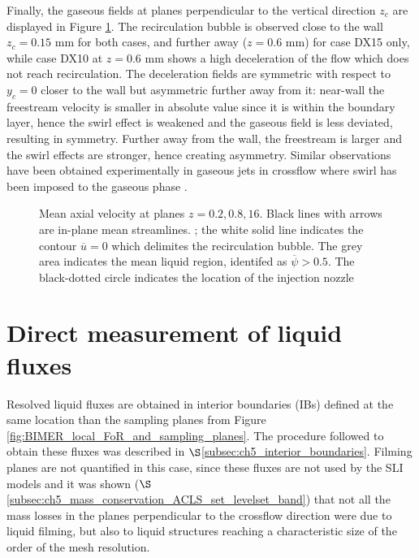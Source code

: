 Finally, the gaseous fields at planes perpendicular to the vertical direction $z_c$ are displayed in Figure \ref{fig:BIMER_turbulent_structures_planes_z}. The recirculation bubble is observed close to the wall $z_c = 0.15$ mm for both cases, and further away ($z = 0.6$ mm) for case DX15 only, while case DX10 at $z = 0.6$ mm shows a high deceleration of the flow which does not reach recirculation. The deceleration fields are symmetric with respect to $y_c = 0$ closer to the wall but asymmetric further away from it: near-wall the freestream velocity is smaller in absolute value since it is within the boundary layer, hence the swirl effect is weakened and the gaseous field is less deviated, resulting in symmetry. Further away from the wall, the freestream is larger and the swirl effects are stronger, hence creating asymmetry. Similar observations have been obtained experimentally in gaseous jets in crossflow where swirl has been imposed to the gaseous phase .



\begin{figure}[ht]
\centering
\caption[Mean axial velocity at planes $z = 0.2, 0.8, 16$ mm]{Mean axial velocity at planes $z = 0.2, 0.8, 16$. Black lines with arrows are in-plane mean streamlines. ; the white solid line indicates the contour $\overline{u} = 0$ which delimites the recirculation bubble. The grey area  indicates the mean liquid region, identifed as $\overline{\psi} > 0.5$. The black-dotted circle indicates the location of the injection nozzle}
\label{fig:BIMER_turbulent_structures_planes_z}
\end{figure}



\section{Direct measurement of liquid fluxes}
\label{sec:ch8_BIMER_IBs}

Resolved liquid fluxes are obtained in  interior boundaries (IBs) defined at the same location than the sampling planes from Figure \ref{fig:BIMER_local_FoR_and_sampling_planes}. The procedure followed to obtain these fluxes was described in $\S$\ref{subsec:ch5_interior_boundaries}. Filming planes are not quantified in this case, since these fluxes are not used by the SLI models and it was shown ($\S$\ref{subsec:ch5_mass_conservation_ACLS_set_levelset_band}) that not all the mass losses in the planes perpendicular to the crossflow direction were due to liquid filming, but also to liquid structures reaching a characteristic size of the order of the mesh resolution.




